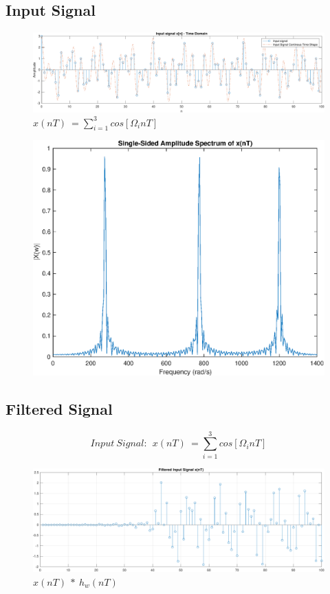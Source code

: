 \documentclass[11pt]{article}
\begin{document}
\subsection{Input Signal}
\begin{figure}[H]
    \centering
    \includegraphics[scale=0.56]{input} 
    \caption{$x( nT) \ =\sum ^{3}_{i=1} cos[ \Omega _{i} nT]$}
\end{figure}
\begin{figure}[H]
    \centering
    \includegraphics[scale=0.45]{Xw.eps} 
\end{figure}

\subsection{Filtered Signal}
$$Input\ Signal: \ \ x( nT) \ =\sum ^{3}_{i=1} cos[ \Omega _{i} nT]$$
\begin{figure}[H]
    \centering
    \includegraphics[scale=0.6]{filtered} 
    \caption{$x( nT) \ *\ h_{w}( nT)$}
\end{figure}
\end{document}
